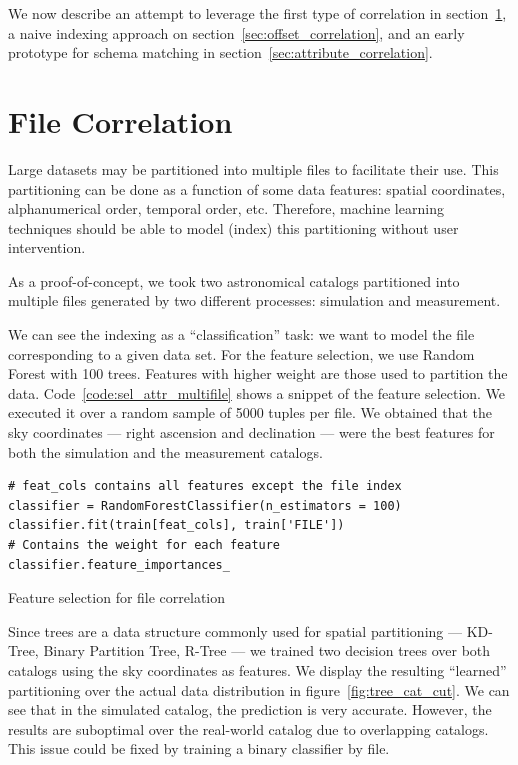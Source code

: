 We now describe an attempt to leverage the first type of correlation in
section~\ref{sec:file_correlation}, a naive indexing approach on section~\ref{sec:offset_correlation},
and an early prototype for schema matching in section~\ref{sec:attribute_correlation}.

\section{File Correlation}
\label{sec:file_correlation}

Large datasets may be partitioned into multiple files to facilitate their use.
This partitioning can be done as a function of some data features: spatial coordinates,
alphanumerical order, temporal order, etc. Therefore, machine learning techniques
should be able to model (index) this partitioning without user intervention.

As a proof-of-concept, we took two astronomical catalogs partitioned into multiple
files generated by two different processes: simulation and measurement.

We can see the indexing as a ``classification'' task: we want to model the file
corresponding to a given data set. For the feature selection, we use Random Forest
with 100 trees. Features with higher weight are those used to partition the data.
Code~\ref{code:sel_attr_multifile} shows a snippet of the feature selection.
We executed it over a random sample of 5000 tuples per file.
We obtained that the sky coordinates --- right ascension and declination --- were
the best features for both the simulation and the measurement catalogs.

\begin{listing}[H]
\begin{verbatim}
# feat_cols contains all features except the file index
classifier = RandomForestClassifier(n_estimators = 100)
classifier.fit(train[feat_cols], train['FILE'])
# Contains the weight for each feature
classifier.feature_importances_
\end{verbatim}
\caption{Feature selection for file correlation}
\label{code:sel_attr_multifile}
\end{listing}

Since trees are a data structure commonly used for spatial partitioning
--- KD-Tree, Binary Partition Tree, R-Tree --- we trained two decision trees over
both catalogs using the sky coordinates as features.
We display the resulting ``learned'' partitioning over the actual data distribution
in figure~\ref{fig:tree_cat_cut}.
We can see that in the simulated catalog, the prediction is very accurate.
However, the results are suboptimal over the real-world catalog due to overlapping catalogs.
This issue could be fixed by training a binary classifier by file.


